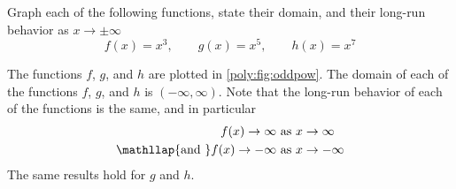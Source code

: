 \begin{pccexample}
\label{poly:ex:oddpow}
Graph each of the following functions, state their domain, and their 
long-run behavior as $x\rightarrow\pm\infty$
\[
    f(x)=x^3,   \qquad  g(x)=x^5, \qquad h(x)=x^7
\]
\begin{pccsolution}
The functions $f$, $g$, and $h$ are plotted in \cref{poly:fig:oddpow}.
The domain of each of the functions $f$, $g$, and $h$ is $(-\infty,\infty)$. Note that 
the long-run behavior of each of the functions is the same, and in particular
\begin{align*}
    f(x)\rightarrow\infty & \text{ as } x\rightarrow\infty\\
    \mathllap{\text{and }}   f(x)\rightarrow-\infty & \text{ as } x\rightarrow-\infty
\end{align*}
The same results hold for $g$ and $h$.
\end{pccsolution}
\end{pccexample}


